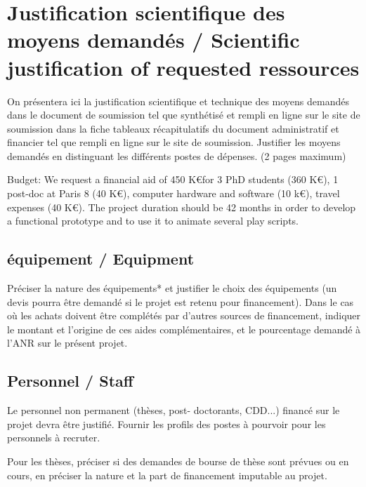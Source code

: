 
\section{Justification scientifique des moyens demand\'es / Scientific justification of requested ressources}
\begin{xcomment}  
On pr\'esentera ici la justification scientifique et technique des moyens demand\'es dans le document de soumission tel que synth\'etis\'e et rempli en ligne sur le site de soumission dans la fiche tableaux r\'ecapitulatifs  du document administratif et financier tel que rempli en ligne sur le site de soumission.
Justifier les moyens demand\'es en distinguant les diff\'erents postes de d\'epenses.
(2 pages maximum)
\end{xcomment}


Budget: We request a financial aid of 450 K\euro for 3 PhD students (360 K\euro), 1 post-doc at Paris 8 (40 K\euro), computer hardware and software (10 k\euro), travel expenses (40 K\euro). The project duration should be 42 months in order to develop a functional prototype and to use it to animate several play scripts.





\subsection{\'equipement / Equipment}
\begin{xcomment}  
Pr\'eciser la nature des \'equipements* et justifier le choix des \'equipements (un devis pourra être demand\'e si le projet est retenu pour financement).
Dans le cas où les achats doivent être compl\'et\'es par d'autres sources de financement, indiquer le montant et l'origine de ces aides compl\'ementaires, et le pourcentage demand\'e à l'ANR sur le pr\'esent projet.
\end{xcomment}

\subsection{Personnel / Staff}
\begin{xcomment}  
Le personnel non permanent (th\`eses, post- doctorants, CDD...) financ\'e sur le projet devra être justifi\'e.
Fournir  les profils des postes à pourvoir pour les personnels à recruter.

Pour les th\`eses, pr\'eciser si des demandes de bourse de th\`ese sont pr\'evues ou en cours, en pr\'eciser la nature et la part de financement imputable au projet. 
\end{xcomment}

